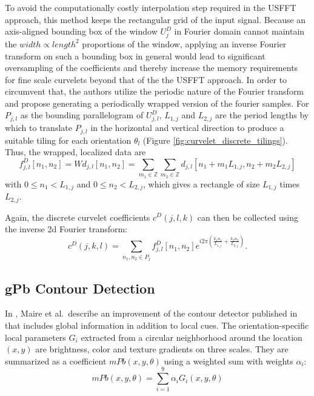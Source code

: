 To avoid the computationally costly interpolation step required in the USFFT
approach, this method keeps the rectangular grid of the input signal. Because
an axis-aligned bounding box of the window $U_j^D$ in Fourier domain cannot
maintain the $width \propto length^2$ proportions of the window, applying an
inverse Fourier transform on such a bounding box in general would lead to
significant oversampling of the coefficients and thereby increase the memory
requirements for fine scale curvelets beyond that of the the USFFT approach. In
order to circumvent that, the authors utilize the periodic nature of the
Fourier transform and propose generating a periodically wrapped version of the
fourier samples. For $P_{j, l}$ as the bounding parallelogram of $U_{j, l}^D$,
$L_{1, j}$ and $L_{2, j}$ are the period lengths by which to translate $P_{j,
l}$ in the horizontal and vertical direction to produce a suitable tiling for
each orientation $\theta_l$ (Figure \ref{fig:curvelet_discrete_tilings}). Thus,
the wrapped, localized data are
\begin{equation*}
    f_{j, l}^D[n_1, n_2] = W d_{j, l}[n_1, n_2] = \sum_{m_1 \in \mathbb{Z}} \sum_{m_2 \in \mathbb{Z}} d_{j, l}[n_1 + m_1 L_{1, j}, n_2 + m_2 L_{2, j}]
\end{equation*}
with $0 \leq n_1 < L_{1, j}$ and $0 \leq n_2 < L_{2, j}$, which gives a
rectangle of size $L_{1, j}$ times $L_{2, j}$.

Again, the discrete curvelet coefficients $c^D(j, l, k)$ can then be collected
using the inverse 2d Fourier transform:
\begin{equation*}
    c^D(j, k, l) = \sum_{n_1, n_2 \in P_j} f_{j, l}^D[n_1, n_2] e^{i 2 \pi (\frac{k_1 n_1}{L_{1, j}} + \frac{k_2 n_2}{L_{2,j}})}.
\end{equation*}

\subsection{gPb Contour Detection}\label{sec:background_gpb}

In \autocite{maire_using_2008}, Maire et al.\ describe an improvement of the
contour detector published in \autocite{martin_learning_2004} that includes
global information in addition to local cues. The orientation-specific local
parameters $G_i$ extracted from a circular neighborhood around the location
$(x, y)$ are brightness, color and texture gradients on three scales. They are
summarized as a coefficient $mPb(x, y, \theta)$ using a weighted sum with
weights $\alpha_i$:
\begin{equation*}
    mPb(x, y, \theta) = \sum_{i=1}^9 \alpha_i G_i(x, y, \theta)
\end{equation*}

